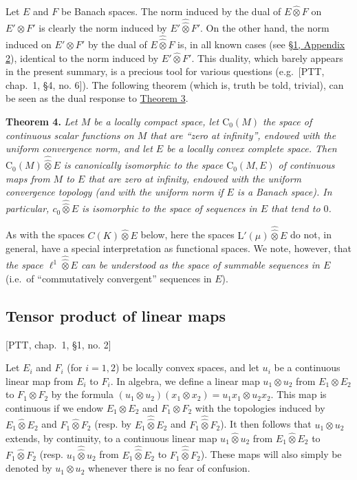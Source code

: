 \documentclass[british]{article}
\newenvironment{itenv}[1]
  {\phantomsection\par\smallskip\noindent\textbf{#1.}\itshape}
  {\par\smallskip}
\newcommand{\oldpage}[1]{\marginpar{\footnotesize$\Big\vert$ \textit{p.~#1}}}
\begin{document}
Let \(E\) and \(F\) be Banach spaces. The norm induced by the dual of
\(E\hat{\otimes}F\) on \(E'\otimes F'\) is clearly the norm induced by
\(E'\hat{\hat{\otimes}}F'\). On the other hand, the norm induced on
\(E'\otimes F'\) by the dual of \(E\hat{\hat{\otimes}}F\) is, in all
known cases (see \hyperref[section-1-appendix-2]{§1, Appendix 2}),
identical to the norm induced by \(E'\hat{\otimes}F'\). This duality,
which barely appears in the present summary, is a precious tool for
various questions (e.g.~{[}PTT, chap.~1, §4, no. 6{]}). \oldpage{83} The
following theorem (which is, truth be told, trivial), can be seen as the
dual response to \hyperref[section-1-theorem-3]{Theorem 3}.

\protect{}\label{section-1-theorem-4}
\begin{itenv}{Theorem 4}
Let \(M\) be a locally compact space, let \(\mathrm{C}_0(M)\) the space
of continuous scalar functions on \(M\) that are ``zero at infinity'',
endowed with the uniform convergence norm, and let \(E\) be a locally
convex complete space. Then \(\mathrm{C}_0(M)\hat{\hat{\otimes}}E\) is
canonically isomorphic to the space \(\mathrm{C}_0(M,E)\) of continuous
maps from \(M\) to \(E\) that are zero at infinity, endowed with the
uniform convergence topology (and with the uniform norm if \(E\) is a
Banach space). In particular, \(c_0\hat{\hat{\otimes}}E\) is isomorphic
to the space of sequences in \(E\) that tend to \(0\).

\end{itenv}

As with the spaces \(C(K)\hat{\otimes}E\) below, here the spaces
\(\mathrm{L}'(\mu)\hat{\hat{\otimes}}E\) do not, in general, have a
special interpretation as functional spaces. We note, however, that
\emph{the space \(\ell^1\hat{\hat{\otimes}}E\) can be understood as the
space of summable sequences in \(E\)} (i.e.~of ``commutatively
convergent'' sequences in \(E\)).

\subsection{Tensor product of linear maps}\label{section-1.6}

{[}PTT, chap.~1, §1, no. 2{]}

\medskip

Let \(E_i\) and \(F_i\) (for \(i=1,2\)) be locally convex spaces, and
let \(u_i\) be a continuous linear map from \(E_i\) to \(F_i\). In
algebra, we define a linear map \(u_1\otimes u_2\) from
\(E_1\otimes E_2\) to \(F_1\otimes F_2\) by the formula
\((u_1\otimes u_2)(x_1\otimes x_2)=u_1x_1\otimes u_2x_2\). This map is
continuous if we endow \(E_1\otimes E_2\) and \(F_1\otimes F_2\) with
the topologies induced by \(E_1\hat{\otimes}E_2\) and
\(F_1\hat{\otimes}F_2\) (resp. by \(E_1\hat{\hat{\otimes}}E_2\) and
\(F_1\hat{\hat{\otimes}}F_2\)). It then follows that \(u_1\otimes u_2\)
extends, by continuity, to a continuous linear map
\(u_1\hat{\otimes}u_2\) from \(E_1\hat{\otimes}E_2\) to
\(F_1\hat{\otimes}F_2\) (resp. \(u_1\hat{\hat{\otimes}}u_2\) from
\(E_1\hat{\hat{\otimes}}E_2\) to \(F_1\hat{\hat{\otimes}}F_2\)). These
maps will also simply be denoted by \(u_1\otimes u_2\) whenever there is
no fear of confusion.
\end{document}

